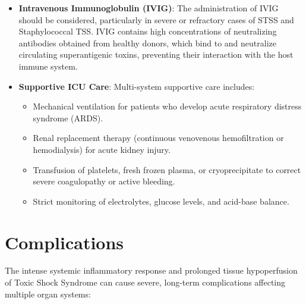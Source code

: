 \begin{itemize}
    \item \textbf{Intravenous Immunoglobulin (IVIG)}: The administration of IVIG should be considered, particularly in severe or refractory cases of STSS and Staphylococcal TSS. IVIG contains high concentrations of neutralizing antibodies obtained from healthy donors, which bind to and neutralize circulating superantigenic toxins, preventing their interaction with the host immune system.
    \item \textbf{Supportive ICU Care}: Multi-system supportive care includes:
    \begin{itemize}
        \item Mechanical ventilation for patients who develop acute respiratory distress syndrome (ARDS).
        \item Renal replacement therapy (continuous venovenous hemofiltration or hemodialysis) for acute kidney injury.
        \item Transfusion of platelets, fresh frozen plasma, or cryoprecipitate to correct severe coagulopathy or active bleeding.
        \item Strict monitoring of electrolytes, glucose levels, and acid-base balance.
    \end{itemize}
\end{itemize}

\section*{Complications}
The intense systemic inflammatory response and prolonged tissue hypoperfusion of Toxic Shock Syndrome can cause severe, long-term complications affecting multiple organ systems:

